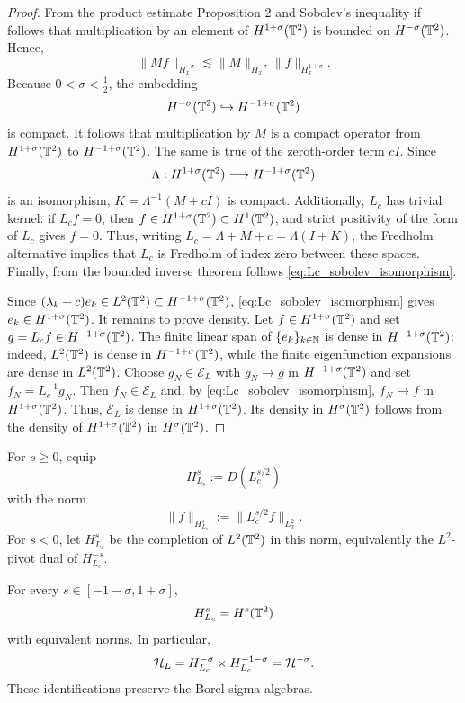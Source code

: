 \begin{proof}
From the product estimate \cite{Benyi2025} Proposition 2 and Sobolev's inequality if follows that multiplication by an element of
$H^{1+\sigma}(\mathbb{T}^2)$ is bounded on $H^{-\sigma}(\mathbb{T}^2)$.  Hence,
\begin{equation}\label{eq:potential_multiplier_bound}
    \|Mf\|_{H^{-\sigma}_x}
    \lesssim
    \|M\|_{H^{-\sigma}_x}\|f\|_{H^{1+\sigma}_x}.
\end{equation}
Because $0 < \sigma<\frac12$, the embedding
\[
    H^{-\sigma}(\mathbb{T}^2)
    \hookrightarrow H^{-1+\sigma}(\mathbb{T}^2)
\]
is compact.  It follows that multiplication by $M$ is a compact
operator from $H^{1+\sigma}(\mathbb{T}^2)$ to $H^{-1+\sigma}(\mathbb{T}^2)$.  The same is true of
the zeroth-order term $cI$.  Since
\[
    \Lambda:H^{1+\sigma}(\mathbb{T}^2)
    \longrightarrow H^{-1+\sigma}(\mathbb{T}^2)
\]
is an isomorphism, $K = \Lambda^{-1}(M+cI)$ is compact. Additionally, $L_c$ has trivial kernel: if $L_cf=0$, then
$f\in H^{1+\sigma}(\mathbb{T}^2)\subset H^1(\mathbb{T}^2)$, and strict positivity of the form of $L_c$ gives $f=0$.
Thus, writing $L_c=\Lambda+M+c = \Lambda(I + K)$, the Fredholm alternative \cite[Theorem~6.6]{Brezis2011} implies that $L_c$ is Fredholm of index zero between
these spaces. Finally, from the bounded inverse theorem follows \eqref{eq:Lc_sobolev_isomorphism}.

Since $(\lambda_k+c)e_k\in L^2(\mathbb{T}^2)\subset H^{-1+\sigma}(\mathbb{T}^2)$,
\eqref{eq:Lc_sobolev_isomorphism} gives $e_k\in H^{1+\sigma}(\mathbb{T}^2)$.
It remains to prove density.  Let $f\in H^{1+\sigma}(\mathbb{T}^2)$ and set
$g=L_cf\in H^{-1+\sigma}(\mathbb{T}^2)$.  The finite linear span of $\{e_k\}_{k \in \mathbb{N}}$ is
dense in $H^{-1+\sigma}(\mathbb{T}^2)$: indeed, $L^2(\mathbb{T}^2)$ is dense in
$H^{-1+\sigma}(\mathbb{T}^2)$, while the finite eigenfunction expansions are dense
in $L^2(\mathbb{T}^2)$.  Choose $g_N\in\mathscr E_L$ with
$g_N\to g$ in $H^{-1+\sigma}(\mathbb{T}^2)$ and set $f_N=L_c^{-1}g_N$.  Then
$f_N\in\mathscr E_L$ and, by \eqref{eq:Lc_sobolev_isomorphism},
$f_N\to f$ in $H^{1+\sigma}(\mathbb{T}^2)$.  Thus, $\mathscr E_L$ is dense in
$H^{1+\sigma}(\mathbb{T}^2)$.  Its density in $H^\sigma(\mathbb{T}^2)$ follows from the density
of $H^{1+\sigma}(\mathbb{T}^2)$ in $H^\sigma(\mathbb{T}^2)$.
\end{proof}
For \(s\geq0\), equip
\[
 H_{L_c}^s:=D(L_c^{s/2})
\]
with the norm 
\[
\|f\|_{H_{L_c}^s}:=\|L_c^{s/2}f\|_{L^2_x}.
\]
For \(s<0\), let \(H_{L_c}^s\) be the completion of \(L^2(\mathbb{T}^2)\)
in this norm, equivalently the \(L^2\)-pivot dual of \(H_{L_c}^{-s}\).

\begin{corollary}\label{cor:equ_norms}
For every \(s\in[-1-\sigma,1+\sigma]\),
\begin{align*}
    H_{L_c}^s=H^s(\mathbb{T}^2)
\end{align*}
with equivalent norms. In particular,
\begin{align*}
 \mathcal{H}_L=H_{L_c}^{-\sigma}\times H_{L_c}^{-1-\sigma}
     =\mathcal{H}^{-\sigma}.
\end{align*}
These identifications preserve the Borel sigma-algebras.
\end{corollary}

